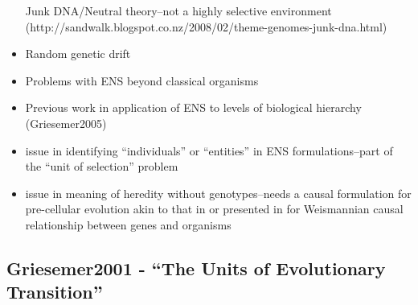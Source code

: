 \begin{itemize}
	      Junk DNA/Neutral theory--not a highly selective environment
	      (http://sandwalk.blogspot.co.nz/2008/02/theme-genomes-junk-dna.html)
	\item
	      Random genetic drift
	\item
	      Problems with ENS beyond classical organisms
	\item
	      Previous work in application of ENS to levels of biological hierarchy
	      (Griesemer2005)
	\item
	      issue in identifying ``individuals'' or ``entities'' in ENS
	      formulations--part of the ``unit of selection'' problem
	\item
	      issue in meaning of heredity without genotypes--needs a causal
	      formulation for pre-cellular evolution akin to that in
	      \autocite{Bourrat2015} or presented in \autocite{Griesemer2005} for
	      Weismannian causal relationship between genes and organisms
\end{itemize}

\hypertarget{griesemer2001---the-units-of-evolutionary-transition}{\subsection{Griesemer2001
		- ``The Units of Evolutionary
		Transition''}\label{griesemer2001---the-units-of-evolutionary-transition}}

